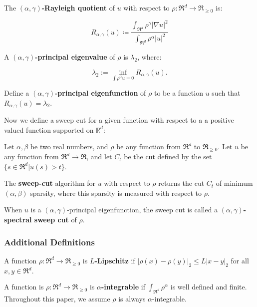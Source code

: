 \begin{definition}
The \textbf{$(\alpha, \gamma)$-Rayleigh quotient} of $u$ with
respect to $\rho:\Re^d \to \Re_{\geq 0}$ is:

\[
  R_{\alpha, \gamma}(u) \coloneqq \frac{\int_{\Re^d} \rho^\gamma
  |\nabla u|^2}{\int_{\Re^d} \rho^{\alpha}|u|^2} 
\]

A \textbf{$(\alpha, \gamma)$-principal eigenvalue} of $\rho$ is
$\lambda_2$, where:

\[ \lambda_2 := \inf_{\int \rho^\alpha u = 0} R_{\alpha, \gamma}(u). \]

Define a \textbf{$(\alpha, \gamma)$-principal eigenfunction} of
$\rho$ to be a function $u$ such that $R_{\alpha, \gamma}(u) =
\lambda_2$.
\end{definition}
\vspace{2 mm}

Now we define a sweep cut for a given function with respect to a
a positive valued function supported on $\mathbb{R}^d$:

\vspace{2 mm}
\begin{definition} Let $\alpha, \beta$ be two real numbers, and $\rho$ be
  any function from $\Re^d$ to $\Re_{\geq 0}$.
  Let $u$ be any function from $\Re^d \to \Re$, and let $C_t$ be the cut
  defined by the set $\{s \in \Re^d | u(s) > t\}$. 
  
  The \textbf{sweep-cut} algorithm
  for $u$ with respect to $\rho$ returns the cut $C_t$ of minimum $(\alpha,
  \beta)$ sparsity, where this sparsity is measured with respect to $\rho$.

When $u$ is a $(\alpha, \gamma)$-principal eigenfunction, the sweep cut is called
a \textbf{$(\alpha, \gamma)$-spectral sweep cut} of $\rho$.  
\end{definition}
\subsubsection{Additional Definitions}
A function $\rho: \Re^d \to \Re_{\geq 0}$ is
\textbf{$L$-Lipschitz} if $|\rho(x)-\rho(y)|_2 \leq L|x-y|_2$ for
all $x, y \in \Re^d.$

A function is $\rho:\Re^d \to \Re_{\geq 0}$ is
\textbf{$\alpha$-integrable} if $\int_{\Re^d} \rho^\alpha$ is
well defined and finite. Throughout this paper, we assume $\rho$
is always $\alpha$-integrable.

